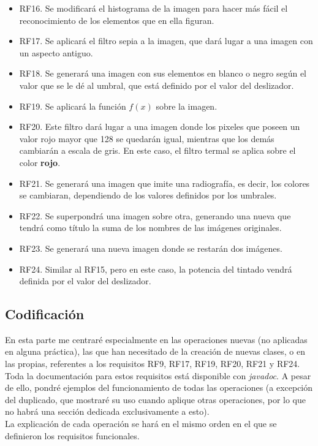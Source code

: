 \documentclass[11pt,a4paper]{article}
\begin{document}
\begin{itemize}
	\item RF16. Se modificará el histograma de la imagen para hacer más fácil el reconocimiento de los elementos que en ella figuran.
	\item RF17. Se aplicará el filtro sepia a la imagen, que dará lugar a una imagen con un aspecto antiguo.
	\item RF18. Se generará una imagen con sus elementos en blanco o negro según el valor que se le dé al umbral, que está definido por el valor del deslizador.
	\item RF19. Se aplicará la función $f(x)$ sobre la imagen.
	\item RF20. Este filtro dará lugar a una imagen donde los pixeles que poseen un valor rojo mayor que 128 se quedarán igual, mientras que los demás cambiarán a escala de gris. En este caso, el filtro termal se aplica sobre el color \textbf{rojo}.
	\item RF21. Se generará una imagen que imite una radiografía, es decir, los colores se cambiaran, dependiendo de los valores definidos por los umbrales.
	\item RF22. Se superpondrá una imagen sobre otra, generando una nueva que tendrá como título la suma de los nombres de las imágenes originales.
	\item RF23. Se generará una nueva imagen donde se restarán dos imágenes.
	\item RF24. Similar al RF15, pero en este caso, la potencia del tintado vendrá definida por el valor del deslizador.
\end{itemize}

\subsection{Codificación}

En esta parte me centraré especialmente en las operaciones nuevas (no aplicadas en alguna práctica), las que han necesitado de la creación de nuevas clases, o en las propias, referentes a los requisitos RF9, RF17, RF19, RF20, RF21 y RF24. Toda la documentación para estos requisitos está disponible con \textit{javadoc}. A pesar de ello, pondré ejemplos del funcionamiento de todas las operaciones (a excepción del duplicado, que mostraré su uso cuando aplique otras operaciones, por lo que no habrá una sección dedicada exclusivamente a esto).\\

La explicación de cada operación se hará en el mismo orden en el que se definieron los requisitos funcionales.
\end{document}
